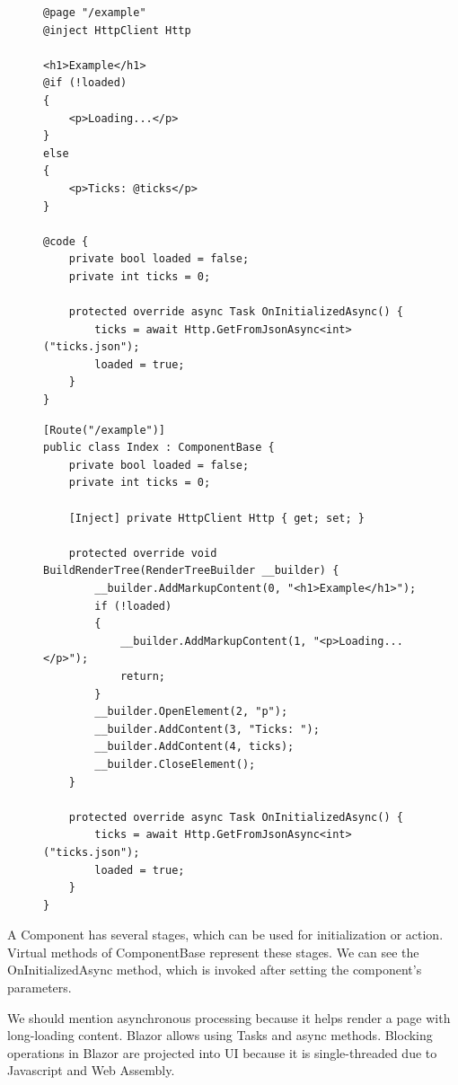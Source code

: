 \begin{figure}
\begin{minipage}[c]{0.95\textwidth}
\begin{lstlisting}[basicstyle=\small, caption=Example of Razor page., label={lst:razorpage}]
@page "/example"
@inject HttpClient Http

<h1>Example</h1>
@if (!loaded)
{
    <p>Loading...</p>
}
else
{
    <p>Ticks: @ticks</p>
}

@code {
    private bool loaded = false;
    private int ticks = 0;

    protected override async Task OnInitializedAsync() {
        ticks = await Http.GetFromJsonAsync<int>("ticks.json");
        loaded = true;
    }
}
\end{lstlisting}
\end{minipage}
\begin{minipage}[c]{0.95\textwidth}
\begin{lstlisting}[basicstyle=\small, caption=Razor page generated to the C\# class., label={lst:component}]
[Route("/example")]
public class Index : ComponentBase {
	private bool loaded = false;
	private int ticks = 0;
	
	[Inject] private HttpClient Http { get; set; }

	protected override void BuildRenderTree(RenderTreeBuilder __builder) {
		__builder.AddMarkupContent(0, "<h1>Example</h1>");
		if (!loaded)
		{
			__builder.AddMarkupContent(1, "<p>Loading...</p>");
			return;
		}
		__builder.OpenElement(2, "p");
		__builder.AddContent(3, "Ticks: ");
		__builder.AddContent(4, ticks);
		__builder.CloseElement();
	}

	protected override async Task OnInitializedAsync() {
		ticks = await Http.GetFromJsonAsync<int>("ticks.json");
		loaded = true;
	}
}
\end{lstlisting}
\end{minipage}
\end{figure}
\par
A Component has several stages, which can be used for initialization or action.
Virtual methods of ComponentBase represent these stages.
We can see the OnInitializedAsync method, which is invoked after setting the component's parameters.
\par
We should mention asynchronous processing because it helps render a page with long-loading content.
Blazor allows using Tasks and async methods.
Blocking operations in Blazor are projected into UI because it is single-threaded due to Javascript and Web Assembly.
\par
